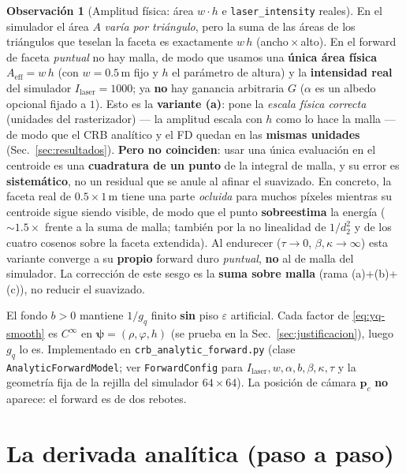 \documentclass[11pt,a4paper]{article}
\theoremstyle{plain}
\theoremstyle{definition}
\newtheorem{remark}{Observaci\'on}
\newcommand{\vect}[1]{\boldsymbol{#1}}
\begin{document}
\begin{remark}[Amplitud f\'isica: \'area $w\!\cdot\!h$ e \texttt{laser\_intensity} reales]
\label{rem:area}
En el simulador el \'area $A$ \emph{var\'ia por tri\'angulo}, pero la suma de las
\'areas de los tri\'angulos que teselan la faceta es exactamente $w\,h$
(ancho\,$\times$\,alto). En el forward de faceta \emph{puntual} no hay malla, de
modo que usamos una \textbf{\'unica \'area f\'isica} $A_{\mathrm{eff}}=w\,h$ (con
$w=0.5$\,m fijo y $h$ el par\'ametro de altura) y la \textbf{intensidad real} del
simulador $I_{\mathrm{laser}}=1000$; ya \textbf{no} hay ganancia arbitraria $G$
($\alpha$ es un albedo opcional fijado a $1$). Esto es la \textbf{variante (a)}:
pone la \emph{escala f\'isica correcta} (unidades del rasterizador) --- la
amplitud escala con $h$ como lo hace la malla --- de modo que el CRB anal\'itico y
el FD quedan en las \textbf{mismas unidades} (Sec.~\ref{sec:resultados}).
\textbf{Pero no coinciden}: usar una \'unica evaluaci\'on en el centroide es una
\textbf{cuadratura de un punto} de la integral de malla, y su error es
\textbf{sistem\'atico}, no un residual que se anule al afinar el suavizado. En
concreto, la faceta real de $0.5\times1$\,m tiene una parte \emph{ocluida} para
muchos p\'ixeles mientras su centroide sigue siendo visible, de modo que el punto
\textbf{sobreestima} la energ\'ia ($\sim1.5\times$ frente a la suma de malla;
tambi\'en por la no linealidad de $1/d_2^2$ y de los cuatro cosenos sobre la
faceta extendida). Al endurecer ($\tau\to0$, $\beta,\kappa\to\infty$) esta
variante converge a su \textbf{propio} forward duro \emph{puntual}, \textbf{no} al
de malla del simulador. La correcci\'on de este sesgo es la \textbf{suma sobre
malla} (rama (a)+(b)+(c)), no reducir el suavizado.
\end{remark}

El fondo $b>0$ mantiene $1/g_q$ finito \textbf{sin} piso $\varepsilon$ artificial.
Cada factor de \eqref{eq:yq-smooth} es $C^\infty$ en $\vect{\psi}=(\rho,\varphi,h)$
(se prueba en la Sec.~\ref{sec:justificacion}), luego $g_q$ lo es. Implementado en
\texttt{crb\_analytic\_forward.py} (clase \texttt{AnalyticForwardModel}; ver
\texttt{ForwardConfig} para $I_{\mathrm{laser}},w,\alpha,b,\beta,\kappa,\tau$ y la
geometr\'ia fija de la rejilla del simulador $64\times64$). La posici\'on de
c\'amara $\vect{p}_c$ \textbf{no} aparece: el forward es de dos rebotes.

\section{La derivada anal\'itica (paso a paso)}
\label{sec:derivadas}
\end{document}
